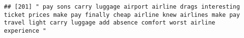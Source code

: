 \documentclass[
]{article}
\begin{document}
\begin{verbatim}
## [201] " pay sons carry luggage airport airline drags interesting ticket prices make pay finally cheap airline knew airlines make pay travel light carry luggage add absence comfort worst airline experience "                                                                                                                                                                                                                                                                                                                                                                                                                                                                                                                                                                                                                                                                                                                                                                                                                                                                                                                                                                                                                                                                                                                                                                                                                                                                                                                                                                                                                                                                                                                                                                                        

\end{verbatim}
\end{document}
